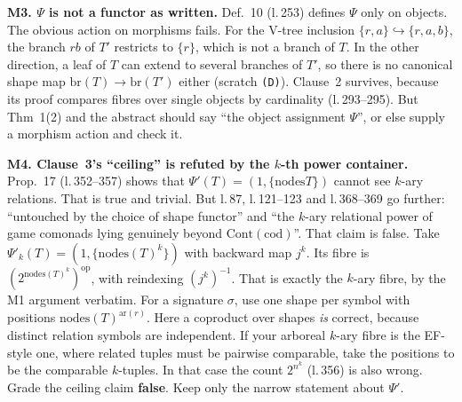 \documentclass[11pt]{article}
\newcommand{\nodes}{\mathrm{nodes}}
\newcommand{\Cont}{\mathrm{Cont}}
\begin{document}
\textbf{M3. $\Psi$ is not a functor as written.} Def.~10 (l.\,253) defines $\Psi$ only on
objects. The obvious action on morphisms fails. For the V-tree inclusion $\{r,a\}\hookrightarrow
\{r,a,b\}$, the branch $rb$ of $T'$ restricts to $\{r\}$, which is not a branch of $T$. In the other
direction, a leaf of $T$ can extend to several branches of $T'$, so there is no canonical shape map
$\mathrm{br}(T)\to\mathrm{br}(T')$ either (scratch \texttt{(D)}). Clause~2 survives, because its proof
compares fibres over single objects by cardinality (l.\,293--295). But Thm~1(2) and the abstract
should say ``the object assignment $\Psi$'', or else supply a morphism action and check it.

\textbf{M4. Clause~3's ``ceiling'' is refuted by the $k$-th power container.} Prop.~17
(l.\,352--357) shows that $\Psi'(T)=(1,\{\nodes T\})$ cannot see $k$-ary relations. That is
true and trivial. But l.\,87, l.\,121--123 and l.\,368--369 go further: ``untouched by the choice
of shape functor'' and ``the $k$-ary relational power of game comonads lying genuinely beyond
$\Cont(\mathrm{cod})$''. That claim is false. Take $\Psi'_k(T)=(1,\{\nodes(T)^k\})$ with backward map
$j^{k}$. Its fibre is $(2^{\nodes(T)^k})^{\mathrm{op}}$, with reindexing $(j^k)^{-1}$. That is
exactly the $k$-ary fibre, by the M1 argument verbatim. For a signature $\sigma$, use one shape per
symbol with positions $\nodes(T)^{\mathrm{ar}(r)}$. Here a coproduct over shapes \emph{is} correct,
because distinct relation symbols are independent. If your arboreal $k$-ary fibre is the EF-style
one, where related tuples must be pairwise comparable, take the positions to be the comparable
$k$-tuples. In that case the count $2^{n^k}$ (l.\,356) is also wrong. Grade the ceiling claim
\textbf{false}. Keep only the narrow statement about $\Psi'$.
\end{document}
